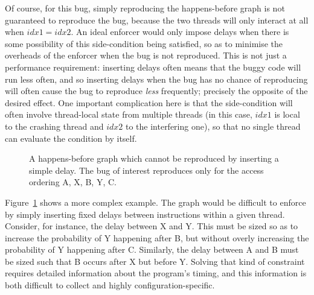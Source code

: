 Of course, for this bug, simply reproducing the happens-before graph
is not guaranteed to reproduce the bug, because the two threads will
only interact at all when $\mathit{idx1} = \mathit{idx2}$.  An ideal
enforcer would only impose delays when there is some possibility of
this side-condition being satisfied, so as to minimise the overheads
of the enforcer when the bug is not reproduced.  This is not just a
performance requirement: inserting delays often means that the buggy
code will run less often, and so inserting delays when the bug has no
chance of reproducing will often cause the bug to reproduce
\emph{less} frequently; precisely the opposite of the desired effect.
One important complication here is that the side-condition will often
involve thread-local state from multiple threads (in this case,
$\mathit{idx1}$ is local to the crashing thread and $\mathit{idx2}$ to
the interfering one), so that no single thread can evaluate the
condition by itself.  

\begin{figure}
  \caption{A happens-before graph which cannot be reproduced by
    inserting a simple delay.  The bug of interest reproduces only for
    the access ordering A, X, B, Y, C.}
  \label{fig:enforce_crash:complex_hb}
\end{figure}

Figure~\ref{fig:enforce_crash:complex_hb} shows a more complex
example.  The graph would be difficult to enforce by simply inserting
fixed delays between instructions within a given thread.  Consider,
for instance, the delay between X and Y.  This must be sized so as to
increase the probability of Y happening after B, but without overly
increasing the probability of Y happening after C.  Similarly, the
delay between A and B must be sized such that B occurs after X but
before Y.  Solving that kind of constraint requires detailed
information about the program's timing, and this information is both
difficult to collect and highly configuration-specific.

